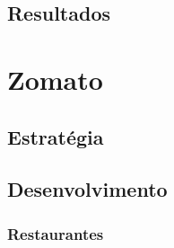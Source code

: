 \documentclass[a4paper,10pt]{article}
\begin{document}
\newpage

\subsection{Resultados}

\newpage

\section{Zomato}

\subsection{Estratégia}

\subsection{Desenvolvimento}

\newpage

\subsubsection{Restaurantes}
\end{document}
